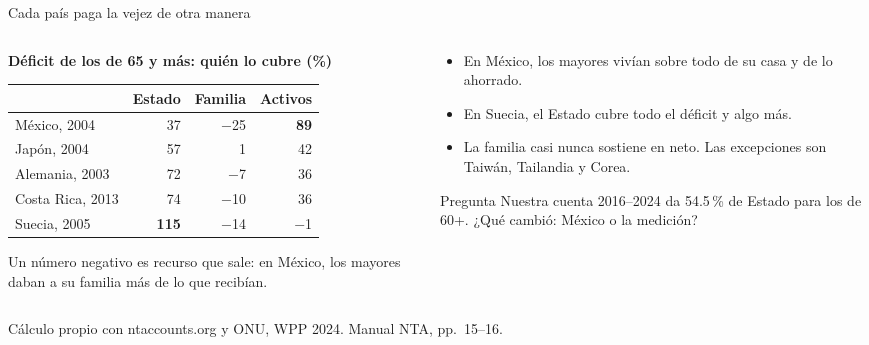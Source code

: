 \documentclass[aspectratio=169,11pt]{beamer}
\newcommand{\fuente}[1]{\par\vfill{\small\color{cGris}#1\par}}
\begin{document}
\begin{frame}{Cada país paga la vejez de otra manera}
  \begin{columns}[T]
    \begin{column}{0.56\textwidth}
      \textbf{Déficit de los de 65 y más: quién lo cubre (\%)}\par\smallskip
      \begin{tabular}{@{}lrrr@{}}
        \toprule
        & Estado & Familia & Activos \\
        \midrule
        México, 2004 & 37 & $-$25 & \textbf{89} \\
        Japón, 2004 & 57 & 1 & 42 \\
        Alemania, 2003 & 72 & $-$7 & 36 \\
        Costa Rica, 2013 & 74 & $-$10 & 36 \\
        Suecia, 2005 & \textbf{115} & $-$14 & $-$1 \\
        \bottomrule
      \end{tabular}
      \par\medskip
      {\small Un número negativo es recurso que sale: en México, los mayores daban a su familia más de lo que recibían.}
    \end{column}
    \begin{column}{0.41\textwidth}
      \begin{itemize}
        \item En México, los mayores vivían sobre todo de su casa y de lo ahorrado.
        \item En Suecia, el Estado cubre todo el déficit y algo más.
        \item La familia casi nunca sostiene en neto. Las excepciones son Taiwán, Tailandia y Corea.
      \end{itemize}
      \pause
      \begin{alertblock}{Pregunta}
        Nuestra cuenta 2016--2024 da 54.5\,\% de Estado para los de 60+. ¿Qué cambió: México o la medición?
      \end{alertblock}
    \end{column}
  \end{columns}
  \fuente{Cálculo propio con ntaccounts.org y ONU, WPP 2024. Manual NTA, pp.~15--16.}
\end{frame}
\end{document}
